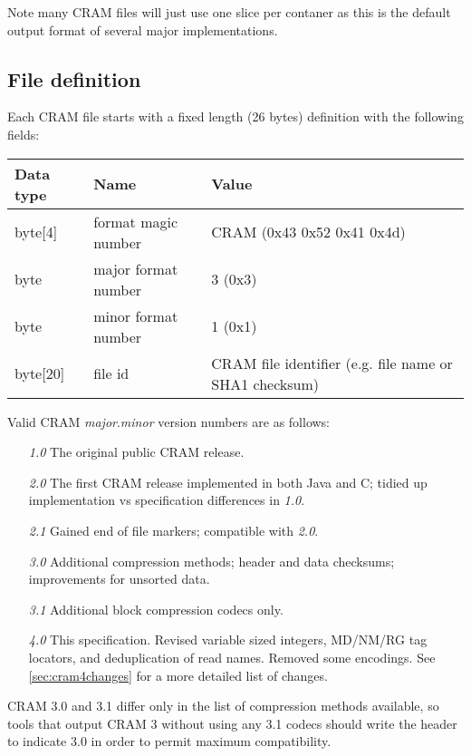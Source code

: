 \documentclass[a4paper]{article}
\begin{document}
Note many CRAM files will just use one slice per contaner as this is
the default output format of several major implementations.

\subsection{File definition}

Each CRAM file starts with a fixed length (26 bytes) definition with the following 
fields:

\begin{tabular}{|l|l|l|}
\hline
\textbf{Data type} & \textbf{Name} & \textbf{Value}\tabularnewline
\hline
byte[4] & format magic number & CRAM (0x43 0x52 0x41 0x4d)\tabularnewline
\hline
byte & major format number & 3 (0x3)\tabularnewline
\hline
byte & minor format number & 1 (0x1)\tabularnewline
\hline
byte[20] & file id & CRAM file identifier (e.g. file name or SHA1 checksum)\tabularnewline
\hline
\end{tabular}

Valid CRAM \textit{major}.\textit{minor} version numbers are as follows:

\begin{itemize}
\item[\textit{1.0}]
The original public CRAM release.

\item[\textit{2.0}]
The first CRAM release implemented in both Java and C; tidied up
implementation vs specification differences in \textit{1.0}.

\item[\textit{2.1}]
Gained end of file markers; compatible with \textit{2.0}.

\item[\textit{3.0}]
Additional compression methods; header and data checksums;
improvements for unsorted data.

\item[\textit{3.1}]
Additional block compression codecs only.

\item[\textit{4.0}]
This specification.  Revised variable sized integers, MD/NM/RG tag
locators, and deduplication of read names.  Removed some encodings.
See \ref{sec:cram4changes} for a more detailed list of changes.
\end {itemize}

CRAM 3.0 and 3.1 differ only in the list of compression
methods available, so tools that output CRAM 3 without using any 3.1
codecs should write the header to indicate 3.0 in order to permit
maximum compatibility.
\end{document}
